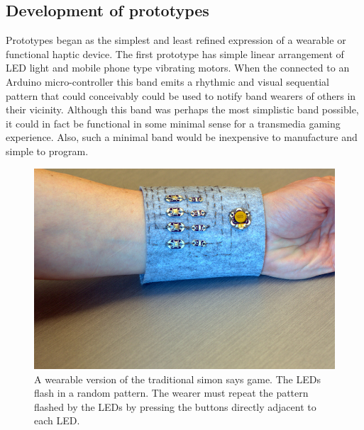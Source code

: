 \documentclass{chi-ext}
\begin{document}
\subsection{ Development of prototypes}
Prototypes began as the simplest and least refined expression of a wearable or functional haptic device. The first prototype has simple linear arrangement of LED light and mobile phone type vibrating motors. When the connected to an Arduino micro-controller this band emits a rhythmic and visual sequential pattern that could conceivably could be used to notify band wearers of others in their vicinity. Although this band was perhaps the most simplistic band possible, it could in fact be functional in some minimal sense for a transmedia gaming experience. Also, such a minimal band would be inexpensive to manufacture and simple to program. 



\begin{figure}
  \begin{center}
  \includegraphics[width=\columnwidth]{images/P1130375.jpg}
  \caption{A wearable version of the traditional simon says game. The LEDs flash in a random pattern. The wearer must repeat the pattern flashed by the LEDs by pressing the buttons directly adjacent to each LED.}
  \label{fig:marginparsample}
  \end{center}  
\end{figure}
\end{document}
